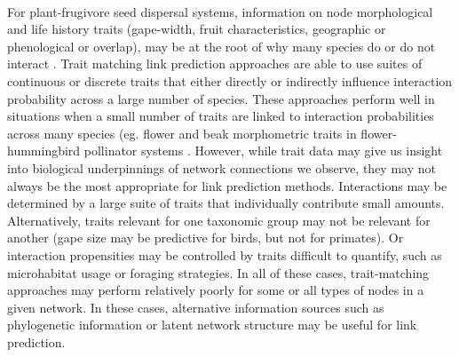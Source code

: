 \documentclass[openacc]{rsproca_new}%
\begin{document}
\paragraph*{}
For plant-frugivore seed dispersal systems, information on node morphological and life history traits (gape-width, fruit characteristics, geographic or phenological or overlap), may be at the root of why many species do or do not interact \cite{bender2018morphological,gonzalez2015relative, moran2010can}. Trait matching link prediction approaches are able to use suites of continuous or discrete traits that either directly or indirectly influence interaction probability across a large number of species. These approaches perform well in situations when a small number of traits are linked to interaction probabilities across many species (eg. flower and beak morphometric traits in flower-hummingbird pollinator systems \cite{pichler2020}. However, while trait data may give us insight into biological underpinnings of network connections we observe, they may not always be the most appropriate for link prediction methods. Interactions may be determined by a large suite of traits that individually contribute small amounts. Alternatively, traits relevant for one taxonomic group may not be relevant for another (gape size may be predictive for birds, but not for primates). Or interaction propensities may be controlled by traits difficult to quantify, such as microhabitat usage or foraging strategies. In all of these cases, trait-matching approaches may perform relatively poorly for some or all types of nodes in a given network. In these cases, alternative information sources such as phylogenetic information or latent network structure may be useful for link prediction. 
\end{document}
